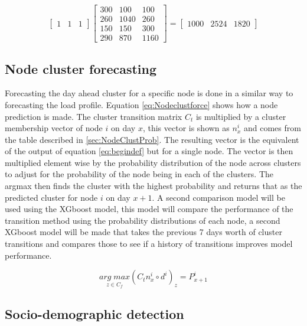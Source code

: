 \begin{equation}
\begin{bmatrix}
 1& 1 & 1   
\end{bmatrix}
\begin{bmatrix}
300 & 100 &100 \\ 
260 &1040  & 260\\ 
150 & 150 &300 \\ 
 290& 870 & 1160
\end{bmatrix}
=
\begin{bmatrix}
1000 & 2524 &  1820 
\end{bmatrix}
\label{eq:endeaxmple}
\end{equation}



\subsection{Node cluster forecasting}

Forecasting the day ahead cluster for a specific node is done in a similar way to forecasting the load profile. Equation \ref{eq:Nodeclustforce} shows how a node prediction is made. The cluster transition matrix $C_t$ is multiplied by a cluster membership vector of node $i$ on day $x$, this vector is shown as $n^{i}_{x}$ and comes from the table described in \ref{sec:NodeClustProb}. The resulting vector is the equivalent of the output of equation \ref{eq:begindef} but for a single node. The vector is then multiplied element wise by the probability distribution of the node across clusters to adjust for the probability of the node being in each of the clusters. The argmax then finds the cluster with the highest probability and returns that as the predicted cluster for node $i$ on day $x+1$. A second comparison model will be used using the XGboost model, this model will compare the performance of the transition method using the probability distributions of each node, a second XGboost model will be made that takes the previous 7 days worth of cluster transitions and compares those to see if a history of transitions improves model performance.


\begin{equation}
    \underset{z\in C_f}{arg \; max}(C_t n^{i}_{x} \circ d^i)_z=P^{i}_{x+1}
\label{eq:Nodeclustforce}
\end{equation}


\subsection{Socio-demographic detection}

